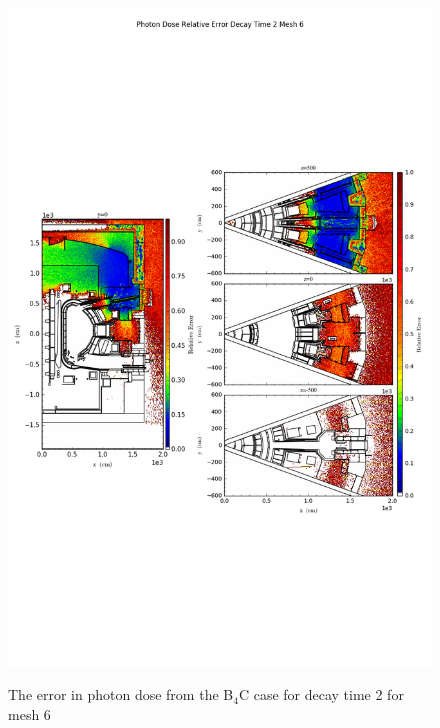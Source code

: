 \begin{figure}[ht!]
\centering
\includegraphics[trim={0cm 9cm 0cm 10cm},clip,scale=0.75]{../plots/final_model_with_b4c/Photon_Dose_Relative_Error_Decay_Time_2_Mesh_6.png}
\label{fig:photons_dc2_no4bc_m6_error}
\caption{The error in photon dose from the B$_4$C case for decay time 2 for mesh 6}
\end{figure}
